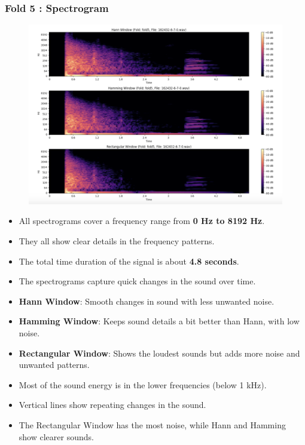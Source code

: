 \documentclass[a4paper,12pt]{article}
\begin{document}
    \subsubsection{Fold 5 : Spectrogram}
    \begin{figure}[H]
        \centering
        \includegraphics[width=1\linewidth]{Fold5.png}
    \end{figure}
    \begin{itemize}
        \item All spectrograms cover a frequency range from  \textbf{0 Hz to 8192 Hz}.
        \item They all show clear details in the frequency patterns.
        \item The total time duration of the signal is about \textbf{4.8 seconds}.
        \item The spectrograms capture quick changes in the sound over time.
        \item \textbf{Hann Window}:  Smooth changes in sound with less unwanted noise.
        \item \textbf{Hamming Window}:  Keeps sound details a bit better than Hann, with low noise.
        \item \textbf{Rectangular Window}: Shows the loudest sounds but adds more noise and unwanted patterns.
        \item Most of the sound energy is in the lower frequencies (below 1 kHz).
        \item Vertical lines show repeating changes in the sound.
        \item The Rectangular Window has the most noise, while Hann and Hamming show clearer sounds.
    \end{itemize}
\newpage
\end{document}
